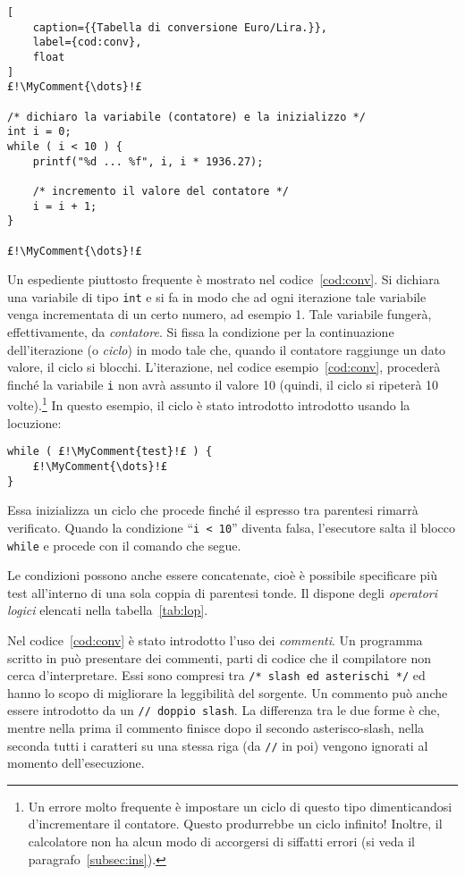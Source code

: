 \begin{lstlisting}[
	caption={{Tabella di conversione Euro/Lira.}},
	label={cod:conv},
	float
]
£!\MyComment{\dots}!£

/* dichiaro la variabile (contatore) e la inizializzo */
int i = 0; 
while ( i < 10 ) {
	printf("%d ... %f", i, i * 1936.27);

	/* incremento il valore del contatore */
	i = i + 1; 
}

£!\MyComment{\dots}!£
\end{lstlisting}
Un espediente piuttosto frequente è mostrato nel codice~\vref{cod:conv}.
Si dichiara una variabile di tipo \lstinline!int! e si fa in modo che ad ogni iterazione tale variabile venga incrementata di un certo numero, ad esempio \num{1}.
Tale  variabile fungerà, effettivamente, da \emph{contatore}. Si fissa la condizione per la continuazione dell'iterazione (o \emph{ciclo}) in modo tale che, quando il contatore raggiunge un dato valore, il ciclo si blocchi.
L'iterazione, nel codice esempio~\ref{cod:conv}, procederà finché la variabile \lstinline!i! non avrà assunto il valore \num{10} (quindi, il ciclo si ripeterà \num{10} volte).\footnote{Un errore molto frequente è impostare un ciclo di questo tipo dimenticandosi d'incrementare il contatore. Questo produrrebbe un ciclo infinito! Inoltre, il calcolatore non ha alcun modo di accorgersi di siffatti errori (si veda il paragrafo~\ref{subsec:ins}).}
In questo esempio, il ciclo è stato introdotto introdotto usando la locuzione:
\begin{lstlisting}
while ( £!\MyComment{test}!£ ) {
	£!\MyComment{\dots}!£
}
\end{lstlisting}
Essa inizializza un ciclo che  procede finché il  espresso tra parentesi rimarrà verificato. Quando la condizione ``\lstinline!i < 10!'' diventa falsa, l'esecutore salta il blocco \lstinline!while! e procede con il comando che segue.

Le condizioni possono anche essere concatenate, cioè è possibile specificare più test all'interno di una sola coppia di parentesi tonde. Il  dispone degli \emph{operatori logici} elencati nella tabella~\ref{tab:lop}.


Nel codice~\ref{cod:conv} è stato introdotto l'uso dei \emph{commenti}.
Un programma scritto in  può presentare dei commenti, parti di codice che il compilatore non cerca d'interpretare.
Essi sono compresi tra \lstinline!/* slash ed asterischi */! ed hanno lo scopo di migliorare la leggibilità del sorgente.
Un commento può anche essere introdotto da un \lstinline!// doppio slash!.
La differenza tra le due forme è che, mentre nella prima il commento finisce dopo il secondo asterisco-slash, nella seconda tutti i caratteri su una stessa riga (da \lstinline!//! in poi) vengono ignorati al momento dell'esecuzione.

